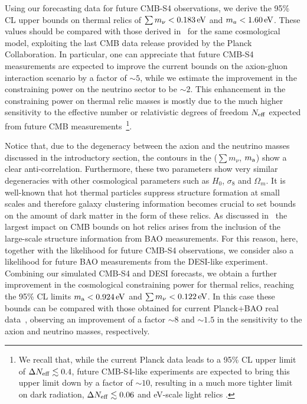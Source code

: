 \documentclass[fleqn,usenatbib,letters]{mnras}
\begin{document}
Using our forecasting data for future CMB-S4 observations, we derive the 95\% CL upper bounds on thermal relics of $\sum m_{\nu}<0.183\,\rm{eV}$ and $m_a<1.60\,\rm{eV}$. These values should be compared with those derived in~\citep{Giare:2020vzo} for the same cosmological model, exploiting the last CMB data release provided by the Planck Collaboration. In particular, one can appreciate that future CMB-S4 measurements are expected to improve the current bounds on the axion-gluon interaction scenario by a factor of $\sim 5$, while we estimate the improvement in the constraining power on the neutrino sector to be $\sim 2$. This enhancement in the constraining power on thermal relic masses is mostly due to the much higher sensitivity to the effective number or relativistic degrees of freedom $N_{\rm eff}$ expected from future CMB measurements~\footnote{We recall that, while the current Planck data leads to a 95\% CL upper limit of $\Delta N_{\rm eff}\lesssim 0.4$, future CMB-S4-like experiments are expected to bring this upper limit down by a factor of $\sim 10$, resulting in a much more tighter limit on dark radiation, $\Delta N_{\rm eff}\lesssim 0.06$ and eV-scale light relics \citep{DePorzio:2020wcz}.}.

Notice that, due to the degeneracy between the axion and the neutrino masses discussed in the introductory section, the contours in the ($\sum m_\nu$, $m_{\rm a}$) show a clear anti-correlation. Furthermore, these two parameters show very similar degeneracies with other cosmological parameters such as $H_0$, $\sigma_8$ and $\Omega_m$. It is well-known that hot thermal particles suppress structure formation at small scales and therefore galaxy clustering information becomes crucial to set bounds on the amount of dark matter in the form of these relics. As discussed in~\citep{Giare:2020vzo} the largest impact on CMB bounds on hot relics arises from the inclusion of the large-scale structure information from BAO measurements. For this reason, here, together with the likelihood for future CMB-S4 observations, we consider also a likelihood for future BAO measurements from the DESI-like experiment. Combining our simulated CMB-S4 and DESI forecasts, we obtain a further improvement in the cosmological constraining power for thermal relics, reaching the 95\% CL limits $m_{\rm a}<0.924\,\rm{eV}$ and $\sum m_{\nu}<0.122\,\rm{eV}$. In this case these bounds can be compared with those obtained for current Planck+BAO real data~\citep{Giare:2020vzo}, observing an improvement of a factor $\sim 8$ and $\sim 1.5$ in the sensitivity to the axion and neutrino masses, respectively. 
\end{document}
